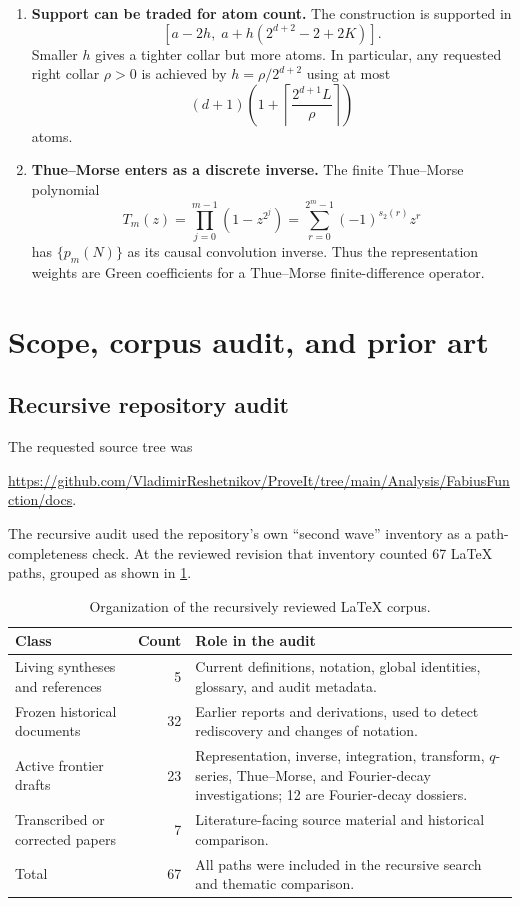 \documentclass[11pt]{article}
\theoremstyle{definition}
\theoremstyle{remark}
\newcommand{\1}{\mathbf{1}}
\begin{document}
\begin{enumerate}
\item \textbf{Support can be traded for atom count.}
The construction is supported in
\[
 [a-2h,\;a+h(2^{d+2}-2+2K)].
\]
Smaller $h$ gives a tighter collar but more atoms.  In particular, any requested
right collar $\rho>0$ is achieved by $h=\rho/2^{d+2}$ using at most
\[
 (d+1)\left(1+\left\lceil\frac{2^{d+1}L}{\rho}\right\rceil\right)
\]
atoms.

\item \textbf{Thue--Morse enters as a discrete inverse.}
The finite Thue--Morse polynomial
\[
 T_m(z)=\prod_{j=0}^{m-1}(1-z^{2^j})
       =\sum_{r=0}^{2^m-1}(-1)^{s_2(r)}z^r
\]
has $\{p_m(N)\}$ as its causal convolution inverse.  Thus the representation
weights are Green coefficients for a Thue--Morse finite-difference operator.
\end{enumerate}

\section{Scope, corpus audit, and prior art}

\subsection{Recursive repository audit}

The requested source tree was
\begin{center}
\url{https://github.com/VladimirReshetnikov/ProveIt/tree/main/Analysis/FabiusFunction/docs}.
\end{center}
The recursive audit used the repository's own ``second wave'' inventory as a
path-completeness check.  At the reviewed revision that inventory counted 67
LaTeX paths, grouped as shown in \cref{tab:corpus}.

\begin{table}[H]
\centering
\caption{Organization of the recursively reviewed LaTeX corpus.}
\label{tab:corpus}
\begin{tabular}{@{}lrp{}@{}}
\toprule
Class & Count & Role in the audit \\
\midrule
Living syntheses and references & 5 & Current definitions, notation, global identities, glossary, and audit metadata.\\
Frozen historical documents & 32 & Earlier reports and derivations, used to detect rediscovery and changes of notation.\\
Active frontier drafts & 23 & Representation, inverse, integration, transform, $q$-series, Thue--Morse, and Fourier-decay investigations; 12 are Fourier-decay dossiers.\\
Transcribed or corrected papers & 7 & Literature-facing source material and historical comparison.\\
\midrule
Total & 67 & All paths were included in the recursive search and thematic comparison.\\
\bottomrule
\end{tabular}
\end{table}
\end{document}
